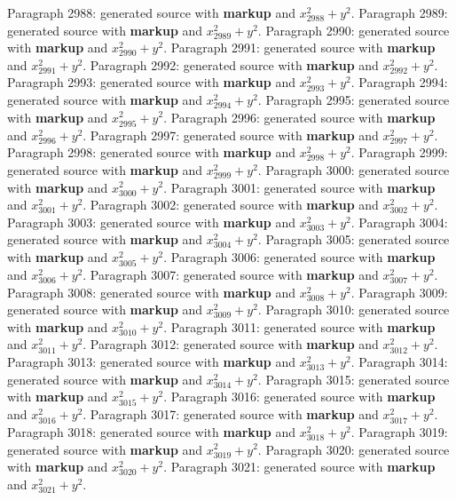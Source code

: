 \documentclass{article}
\begin{document}
Paragraph 2988: generated source with \textbf{markup} and $x_{2988}^2 + y^2$.
Paragraph 2989: generated source with \textbf{markup} and $x_{2989}^2 + y^2$.
Paragraph 2990: generated source with \textbf{markup} and $x_{2990}^2 + y^2$.
Paragraph 2991: generated source with \textbf{markup} and $x_{2991}^2 + y^2$.
Paragraph 2992: generated source with \textbf{markup} and $x_{2992}^2 + y^2$.
Paragraph 2993: generated source with \textbf{markup} and $x_{2993}^2 + y^2$.
Paragraph 2994: generated source with \textbf{markup} and $x_{2994}^2 + y^2$.
Paragraph 2995: generated source with \textbf{markup} and $x_{2995}^2 + y^2$.
Paragraph 2996: generated source with \textbf{markup} and $x_{2996}^2 + y^2$.
Paragraph 2997: generated source with \textbf{markup} and $x_{2997}^2 + y^2$.
Paragraph 2998: generated source with \textbf{markup} and $x_{2998}^2 + y^2$.
Paragraph 2999: generated source with \textbf{markup} and $x_{2999}^2 + y^2$.
Paragraph 3000: generated source with \textbf{markup} and $x_{3000}^2 + y^2$.
Paragraph 3001: generated source with \textbf{markup} and $x_{3001}^2 + y^2$.
Paragraph 3002: generated source with \textbf{markup} and $x_{3002}^2 + y^2$.
Paragraph 3003: generated source with \textbf{markup} and $x_{3003}^2 + y^2$.
Paragraph 3004: generated source with \textbf{markup} and $x_{3004}^2 + y^2$.
Paragraph 3005: generated source with \textbf{markup} and $x_{3005}^2 + y^2$.
Paragraph 3006: generated source with \textbf{markup} and $x_{3006}^2 + y^2$.
Paragraph 3007: generated source with \textbf{markup} and $x_{3007}^2 + y^2$.
Paragraph 3008: generated source with \textbf{markup} and $x_{3008}^2 + y^2$.
Paragraph 3009: generated source with \textbf{markup} and $x_{3009}^2 + y^2$.
Paragraph 3010: generated source with \textbf{markup} and $x_{3010}^2 + y^2$.
Paragraph 3011: generated source with \textbf{markup} and $x_{3011}^2 + y^2$.
Paragraph 3012: generated source with \textbf{markup} and $x_{3012}^2 + y^2$.
Paragraph 3013: generated source with \textbf{markup} and $x_{3013}^2 + y^2$.
Paragraph 3014: generated source with \textbf{markup} and $x_{3014}^2 + y^2$.
Paragraph 3015: generated source with \textbf{markup} and $x_{3015}^2 + y^2$.
Paragraph 3016: generated source with \textbf{markup} and $x_{3016}^2 + y^2$.
Paragraph 3017: generated source with \textbf{markup} and $x_{3017}^2 + y^2$.
Paragraph 3018: generated source with \textbf{markup} and $x_{3018}^2 + y^2$.
Paragraph 3019: generated source with \textbf{markup} and $x_{3019}^2 + y^2$.
Paragraph 3020: generated source with \textbf{markup} and $x_{3020}^2 + y^2$.
Paragraph 3021: generated source with \textbf{markup} and $x_{3021}^2 + y^2$.
\end{document}
